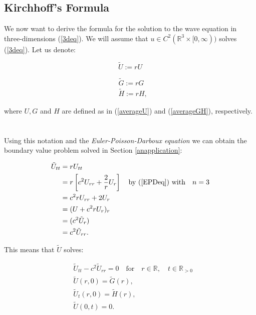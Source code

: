 \documentclass[a4paper, 12pt]{article}
\numberwithin{equation}{section}
\begin{document}
\subsection{Kirchhoff's Formula}
We now want to derive the formula for the solution to the wave equation in three-dimensions (\ref{3deq}). We will assume that $u \in C^2(\mathbb{R}^3 \times
[0, \infty))$ solves (\ref{3deq}). Let us denote:

\begin{equation} \label{Udash}
    \tilde{U}:=rU
\end{equation}

\begin{equation} \label{GHdash}
    \begin{aligned}
        &\tilde{G}:=rG\\
        &\tilde{H}:=rH,    
    \end{aligned}
\end{equation}

where $U,G$ and $H$ are defined as in (\ref{averageU}) and (\ref{averageGH}), respectively. 
\\
\\
\\

Using this notation and the \emph{Euler-Poisson-Darboux equation} we can
obtain the boundary value problem solved in Section \ref{anapplication}:

\begin{equation*}
    \begin{aligned}
        \tilde{U}_{tt}&=rU_{tt}\\
        &=r\left[c^2U_{rr}+\frac{2}{r}U_r\right] \quad \textrm{by (\ref{EPDeq}) with} \quad n=3\\
        &=c^2rU_{rr}+2U_r\\
        &=(U+c^2rU_r)_r\\
        &=(c^2\tilde{U}_r)\\
        &=c^2\tilde{U}_{rr}.        
    \end{aligned}
\end{equation*}

This means that $\tilde{U}$ solves:

\begin{equation} \label{tilUwave}
    \begin{aligned}
        &\tilde{U}_{tt}-c^2\tilde{U}_{rr}=0 \quad \textrm {for} \quad r \in \mathbb{R}, \quad t \in \mathbb{R}_{>0}\\
        &\tilde{U}(r, 0)=\tilde{G}(r), \\
        &\tilde{U}_t(r, 0)=\tilde{H}(r),\\
        &\tilde{U}(0, t)=0.
    \end{aligned}
\end{equation}
\end{document}
